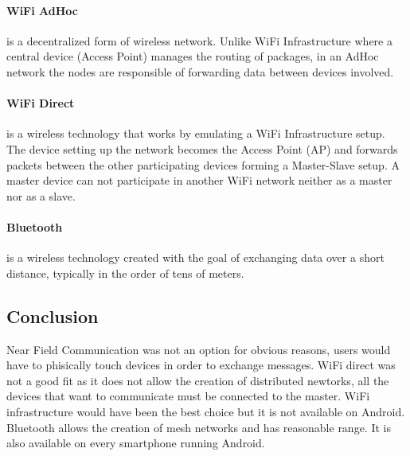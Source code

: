 \paragraph{WiFi AdHoc} 
is a decentralized form of wireless network. Unlike WiFi Infrastructure where a central device (Access Point) manages the routing of packages, in an AdHoc network the nodes are responsible of forwarding data between devices involved.

\paragraph{WiFi Direct}
is a wireless technology that works by emulating a WiFi Infrastructure setup. The device setting up the network becomes the Access Point (AP) and forwards packets between the other participating devices forming a Master-Slave setup.
A master device can not participate in another WiFi network neither as a master nor as a slave.

\paragraph{Bluetooth}
is a wireless technology created with the goal of exchanging data over a short distance, typically in the order of tens of meters.

\subsection{Conclusion}
Near Field Communication was not an option for obvious reasons, users would have to phisically touch devices in order to exchange messages.
WiFi direct was not a good fit as it does not allow the creation of distributed newtorks, all the devices that want to communicate must be connected to the master.
WiFi infrastructure would have been the best choice but it is not available on Android.
Bluetooth allows the creation of mesh networks and has reasonable range. It is also available on every smartphone running Android.
